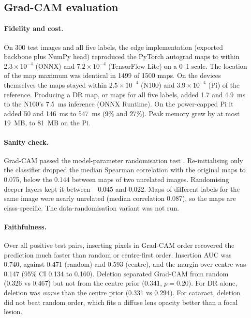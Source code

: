 \documentclass[a4paper,fleqn]{cas-sc}
\begin{document}
\subsection{Grad-CAM evaluation}
\paragraph{Fidelity and cost.} On 300 test images and all five labels,
the edge implementation (exported backbone plus NumPy head) reproduced the
PyTorch autograd maps to within $2.3\times10^{-4}$ (ONNX) and
$7.2\times10^{-4}$ (TensorFlow Lite) on a 0--1 scale. The location of the
map maximum was identical in 1499 of 1500 maps. On the devices themselves
the maps stayed within $2.5\times10^{-4}$ (N100) and $3.9\times10^{-4}$
(Pi) of the reference. Producing a DR map, or maps for all five labels,
added 1.7 and 4.9~ms to the N100's 7.5~ms inference (ONNX Runtime). On
the power-capped Pi it added 50 and 146~ms to 547~ms (9\% and 27\%).
Peak memory grew by at most 19~MB, to 81~MB on the Pi.

\paragraph{Sanity check.} Grad-CAM passed the model-parameter
randomisation test \cite{adebayo2018sanity}. Re-initialising only the
classifier dropped the median Spearman correlation with the original maps
to 0.075, below the 0.144 between maps of two unrelated images.
Randomising deeper layers kept it between $-0.045$ and 0.022. Maps of
different labels for the same image were nearly unrelated (median
correlation 0.087), so the maps are class-specific. The data-randomisation
variant was not run.

\paragraph{Faithfulness.} Over all positive test pairs, inserting pixels
in Grad-CAM order recovered the prediction much faster than random or
centre-first order. Insertion AUC was 0.740, against 0.471 (random) and
0.593 (centre), and the margin over centre was 0.147 (95\% CI 0.134 to
0.160). Deletion separated Grad-CAM from random (0.326 vs 0.467) but not
from the centre prior (0.341, $p=0.20$). For DR alone, deletion was
\emph{worse} than the centre prior (0.331 vs 0.294). For cataract,
deletion did not beat random order, which fits a diffuse lens opacity
better than a focal lesion.
\end{document}

